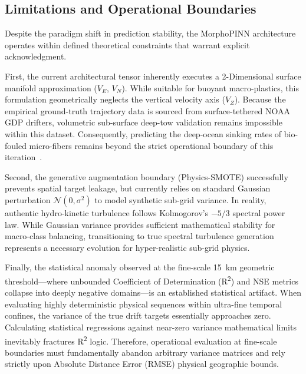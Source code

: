 \documentclass[conference]{IEEEtran}
\begin{document}
\subsection{Limitations and Operational Boundaries}
Despite the paradigm shift in prediction stability, the MorphoPINN architecture operates within defined theoretical constraints that warrant explicit acknowledgment.

First, the current architectural tensor inherently executes a 2-Dimensional surface manifold approximation ($V_E$, $V_N$). While suitable for buoyant macro-plastics, this formulation geometrically neglects the vertical velocity axis ($V_Z$). Because the empirical ground-truth trajectory data is sourced from surface-tethered NOAA GDP drifters, volumetric sub-surface deep-tow validation remains impossible within this dataset. Consequently, predicting the deep-ocean sinking rates of bio-fouled micro-fibers remains beyond the strict operational boundary of this iteration~\cite{ref40}.

Second, the generative augmentation boundary (Physics-SMOTE) successfully prevents spatial target leakage, but currently relies on standard Gaussian perturbation $\mathcal{N}(0, \sigma^2)$ to model synthetic sub-grid variance. In reality, authentic hydro-kinetic turbulence follows Kolmogorov's $-5/3$ spectral power law. While Gaussian variance provides sufficient mathematical stability for macro-class balancing, transitioning to true spectral turbulence generation represents a necessary evolution for hyper-realistic sub-grid physics.

Finally, the statistical anomaly observed at the fine-scale 15~km geometric threshold---where unbounded Coefficient of Determination (R\textsuperscript{2}) and NSE metrics collapse into deeply negative domains---is an established statistical artifact. When evaluating highly deterministic physical sequences within ultra-fine temporal confines, the variance of the true drift targets essentially approaches zero. Calculating statistical regressions against near-zero variance mathematical limits inevitably fractures R\textsuperscript{2} logic. Therefore, operational evaluation at fine-scale boundaries must fundamentally abandon arbitrary variance matrices and rely strictly upon Absolute Distance Error (RMSE) physical geographic bounds.
\end{document}

